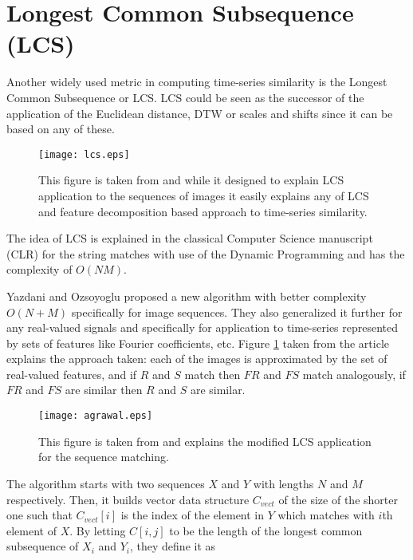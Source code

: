 \section{Longest Common Subsequence (LCS) } \label{lcs}
Another widely used metric in computing time-series similarity is the Longest Common Subsequence or LCS. LCS could be seen as the successor of the application of the Euclidean distance, DTW or scales and shifts \cite{citeulike:3816327} since it can be based on any of these. 
\begin{figure}[tbp]
   \centering
   \texttt{[image: lcs.eps]}
   \caption{This figure is taken from \cite{citeulike:4367061} and while it designed to explain LCS application to the sequences of images it easily explains any of LCS and feature decomposition based approach to time-series similarity.}
   \label{fig:lcs}
\end{figure} 
The idea of LCS is explained in the classical Computer Science manuscript \cite{citeulike:180287} (CLR) for the string matches with use of the Dynamic Programming and has the complexity of $O(NM)$. 

Yazdani and Ozsoyoglu \cite{citeulike:4367061} proposed a new algorithm with better complexity $O(N+M)$ specifically for image sequences. They also generalized it further for any real-valued signals and specifically for application to time-series represented by sets of features like Fourier coefficients, etc. Figure \ref{fig:lcs} taken from the article explains the approach taken: each of the images is approximated by the set of real-valued features, and if $R$ and $S$ match then $FR$ and $FS$ match analogously, if $FR$ and $FS$ are similar then $R$ and $S$ are similar.

\begin{figure}[bp]
   \centering
   \texttt{[image: agrawal.eps]}
   \caption{This figure is taken from \cite{citeulike:3816327} and explains the modified LCS application for the sequence matching.}
   \label{fig:agrawal_lcs}
\end{figure} 

The algorithm starts with two sequences $X$ and $Y$ with lengths $N$ and $M$ respectively. Then, it builds vector data structure $C_{vect}$ of the size of the shorter one such that $C_{vect}[i]$ is the index of the element in $Y$ which matches with $i$th element of $X$. By letting $C[i,j]$ to be the length of the longest common subsequence of $X_{i}$ and $Y_{i}$, they define it as 

